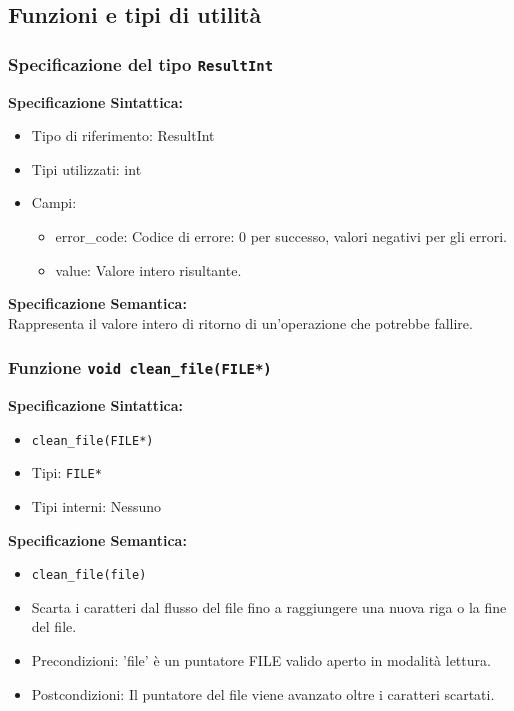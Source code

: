 \documentclass[11pt]{scrartcl} %
\begin{document}
\subsection{Funzioni e tipi di utilità}

\subsubsection{Specificazione del tipo \texttt{ResultInt}}


\textbf{Specificazione Sintattica:}
\begin{itemize}
	\item Tipo di riferimento: ResultInt
	\item Tipi utilizzati: int
	\item Campi:
	      \begin{itemize}
		      \item error\_code: Codice di errore: 0 per successo, valori negativi per gli errori.
		      \item value: Valore intero risultante.
	      \end{itemize}
\end{itemize}



\textbf{Specificazione Semantica:} \\
Rappresenta il valore intero di ritorno di un'operazione che potrebbe fallire.

\subsubsection{Funzione \texttt{void clean\_file(FILE*)}}

\textbf{Specificazione Sintattica:}
\begin{itemize}
	\item \texttt{clean\_file(FILE*)}
	\item Tipi: \texttt{FILE*}
	\item Tipi interni: Nessuno
\end{itemize}

\textbf{Specificazione Semantica:}
\begin{itemize}
	\item \texttt{clean\_file(file)}
	\item Scarta i caratteri dal flusso del file fino a raggiungere una nuova riga o la fine del file.
	\item Precondizioni: 'file' è un puntatore FILE valido aperto in modalità lettura.
	\item Postcondizioni: Il puntatore del file viene avanzato oltre i caratteri scartati.
\end{itemize}
\end{document}
